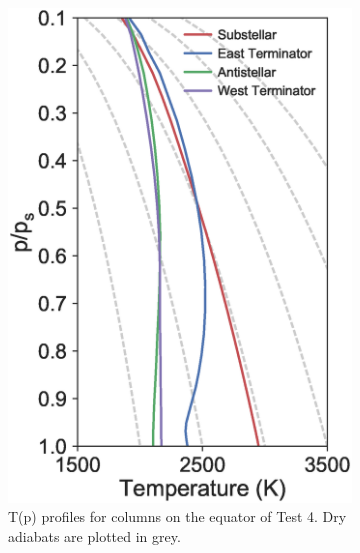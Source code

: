 \begin{figure}
  \begin{subfigure}[t]{0.32\textwidth}
    \includegraphics[width=\textwidth]{figures/linking-climate-55cnce/Tprofiles.eps}
    \caption{T(p) profiles for columns on the equator of Test 4. Dry adiabats are plotted in grey.}
    \label{fig:tp-profiles}
  \end{subfigure}
\enskip
  \begin{subfigure}[t]{0.32\textwidth}

\end{subfigure}
\end{figure}
